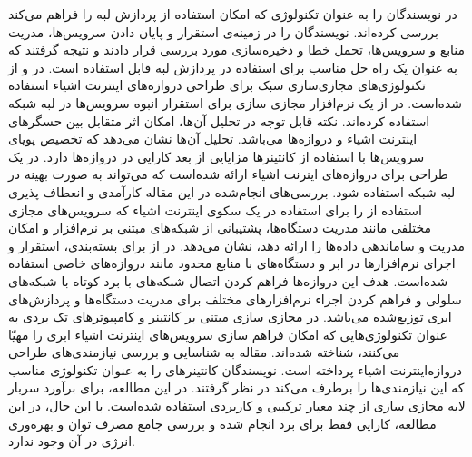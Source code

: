       در \cite{ismail2015evaluation} نویسندگان  را به عنوان تکنولوژی که امکان استفاده از پردازش لبه را فراهم می‌کند بررسی کرده‌اند.
      نویسندگان  را در زمینه‌ی استقرار و پایان دادن سرویس‌ها، مدریت منابع و سرویس‌ها، تحمل خطا و ذخیره‌سازی مورد بررسی قرار دادند و نتیجه گرفتند که  به عنوان یک راه حل مناسب برای استفاده در پردازش لبه قابل استفاده است.
      در \cite{viswanath2016system} و \cite{morabito2016enabling} از تکنولوژی‌های مجازی‌سازی سبک برای طراحی دروازه‌های اینترنت اشیاء استفاده شده‌است.
      در \cite{viswanath2016system} از یک نرم‌افزار مجازی سازی برای استقرار انبوه سرویس‌ها در لبه شبکه استفاده کرده‌اند.
      نکته قابل توجه در تحلیل آن‌ها، امکان اثر متقابل بین حسگر‌های اینترنت اشیاء و دروازه‌‌ها می‌باشد.
      تحلیل آن‌ها نشان می‌دهد که تخصیص پویای سرویس‌ها با استفاده از کانتینر‌ها مزایایی از بعد کارایی در دروازه‌ها دارد.
      در \cite{morabito2016enabling} یک طراحی برای دروازه‌های اینرنت اشیاء ارائه شده‌است که می‌تواند به صورت بهینه در لبه شبکه استفاده شود.
      بررسی‌های انجام‌شده در این مقاله کارآمدی و انعطاف پذیری استفاده از  را برای استفاده در یک سکوی‌ اینترنت اشیاء که سرویس‌های مجازی مختلفی مانند مدریت دستگاه‌ها، پشتیبانی از شبکه‌های مبتنی بر نرم‌افزار و امکان مدریت و ساماندهی داده‌ها را ارائه دهد، نشان می‌دهد.
      در \cite{novo2015capillary} از  برای بسته‌بندی، استقرار و اجرای نرم‌افزار‌ها در ابر و دستگاه‌های با منابع محدود مانند دروازه‌های خاصی استفاده شده‌است.
      هدف این دروازه‌ها فراهم کردن اتصال شبکه‌های با برد کوتاه با شبکه‌های سلولی و فراهم کردن اجزاء نرم‌افزار‌های مختلف برای مدریت دستگاه‌ها و پردازش‌های ابری توزیع‌شده می‌باشد.
      در \cite{celesti2016exploring} مجازی سازی مبتنی بر کانتینر و کامپیوتر‌های تک بردی به عنوان تکنولوژی‌هایی که امکان فراهم سازی سرویس‌های اینترنت اشیاء ابری را مهیّا می‌کنند، شناخته شده‌اند.
      مقاله \cite{krylovskiy2015internet} به شناسایی و بررسی نیازمندی‌های طراحی دروازه‌اینترنت اشیاء پرداخته است.
      نویسندگان کانتینر‌های  را به عنوان تکنولوژی مناسب که این نیازمندی‌ها را برطرف می‌کند در نظر گرفتند.
      در این مطالعه، برای برآورد سربار لایه مجازی سازی از چند معیار ترکیبی و کاربردی استفاده شده‌است.
      با این حال، در این مطالعه، کارایی فقط برای برد  انجام شده و بررسی جامع مصرف توان و بهره‌وری انرژی در آن وجود ندارد.